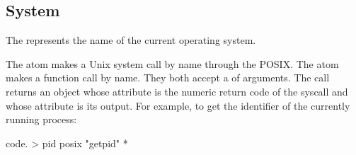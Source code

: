 
\subsection{System}\label{sec:system}

The  represents the name of the current operating system.

The  atom makes a Unix system call by name through the POSIX.
The  atom makes a  function call by name.
They both accept a  of arguments.
The call returns an object whose  attribute is the numeric
  return code of the syscall and whose  attribute is its output.
For example, to get the identifier of the currently running process:

\begin{ffcode}
code. > pid
  posix
    "getpid"
    *
\end{ffcode}
